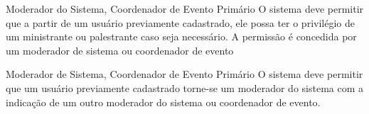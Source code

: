 {Moderador do Sistema, Coordenador de Evento}
{Primário}
{O sistema deve permitir que a partir de um usuário previamente cadastrado, ele possa ter o privilégio de um ministrante ou palestrante caso seja necessário. A permissão é concedida por um moderador de sistema ou coordenador de evento}

{Moderador de Sistema, Coordenador de Evento}
{Primário}
{O sistema deve permitir que um usuário previamente cadastrado torne-se um moderador do sistema com a indicação de um outro moderador do sistema ou coordenador de evento.}